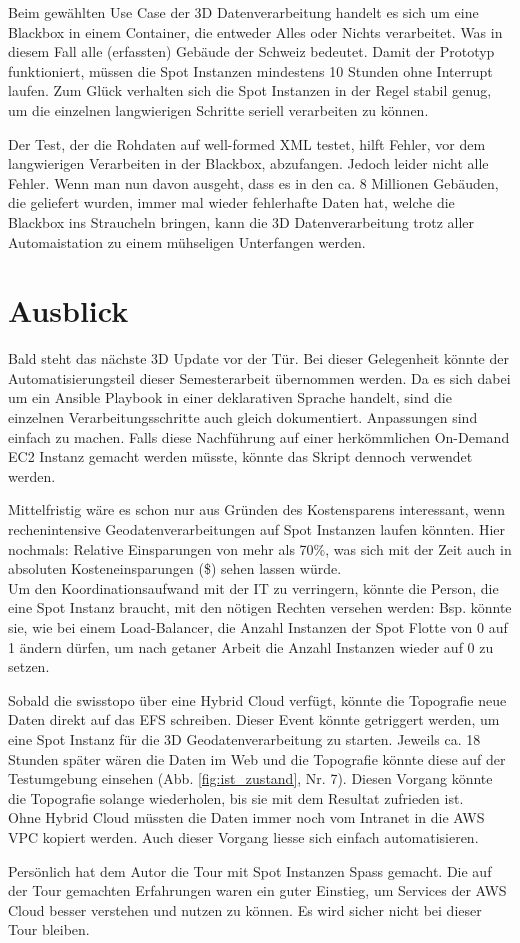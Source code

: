 Beim gewählten Use Case der 3D Datenverarbeitung handelt es sich um eine Blackbox in einem Container, die entweder Alles oder Nichts verarbeitet. Was in diesem Fall alle (erfassten) Gebäude der Schweiz bedeutet. Damit der Prototyp funktioniert, müssen die Spot Instanzen mindestens 10 Stunden ohne Interrupt laufen. Zum Glück verhalten sich die Spot Instanzen in der Regel stabil genug, um die einzelnen langwierigen Schritte seriell verarbeiten zu können.

Der Test, der die Rohdaten auf well-formed XML testet, hilft Fehler, vor dem langwierigen Verarbeiten in der Blackbox, abzufangen. Jedoch leider nicht alle Fehler. Wenn man nun davon ausgeht, dass es in den ca. 8 Millionen Gebäuden, die geliefert wurden, immer mal wieder fehlerhafte Daten hat, welche die Blackbox ins Straucheln bringen, kann die 3D Datenverarbeitung trotz aller Automaistation zu einem mühseligen Unterfangen werden.

\section{Ausblick}
Bald steht das nächste 3D Update vor der Tür. Bei dieser Gelegenheit könnte der Automatisierungsteil dieser Semesterarbeit übernommen werden. Da es sich dabei um ein Ansible Playbook in einer deklarativen Sprache handelt, sind die einzelnen Verarbeitungsschritte auch gleich dokumentiert. Anpassungen sind einfach zu machen. Falls diese Nachführung auf einer herkömmlichen On-Demand EC2 Instanz gemacht werden müsste, könnte das Skript dennoch verwendet werden.

Mittelfristig wäre es schon nur aus Gründen des Kostensparens interessant, wenn rechenintensive Geodatenverarbeitungen auf Spot Instanzen laufen könnten. Hier nochmals: Relative Einsparungen von mehr als 70\%, was sich mit der Zeit auch in absoluten Kosteneinsparungen (\$) sehen lassen würde.\\ Um den Koordinationsaufwand mit der IT zu verringern, könnte die Person, die eine Spot Instanz braucht, mit den nötigen Rechten versehen werden: Bsp. könnte sie, wie bei einem Load-Balancer, die Anzahl Instanzen der Spot Flotte von 0 auf 1 ändern dürfen, um nach getaner Arbeit die Anzahl Instanzen wieder auf 0 zu setzen.

Sobald die swisstopo über eine Hybrid Cloud verfügt, könnte die Topografie neue Daten direkt auf das EFS schreiben. Dieser Event könnte getriggert werden, um eine Spot Instanz für die 3D Geodatenverarbeitung zu starten. Jeweils ca. 18 Stunden später wären die Daten im Web und die Topografie könnte diese auf der Testumgebung einsehen (Abb. \ref{fig:ist_zustand}, Nr. 7). Diesen Vorgang könnte die Topografie solange wiederholen, bis sie mit dem Resultat zufrieden ist.\\Ohne Hybrid Cloud müssten die Daten immer noch vom Intranet in die AWS VPC kopiert werden. Auch dieser Vorgang liesse sich einfach automatisieren.

Persönlich hat dem Autor die Tour mit Spot Instanzen Spass gemacht. Die auf der Tour gemachten Erfahrungen waren ein guter Einstieg, um Services der AWS Cloud besser verstehen und nutzen zu können. Es wird sicher nicht bei dieser Tour bleiben.

